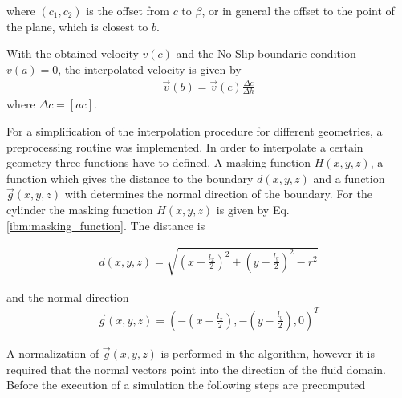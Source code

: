 where $(c_1, c_2)$ is the offset from $c$ to $\beta$, or in general the offset to the point of the plane, which is closest to $b$.

With the obtained velocity $v(c)$ and  the No-Slip boundarie condition $v(a) = 0$,
the interpolated velocity is given by
\begin{align}
    \vec{v}(b)  =  \vec{v}(c)\frac{\Delta c}{\Delta h}
\end{align}
where $\Delta c = [ac]$.

For a simplification of the interpolation procedure for different geometries, a preprocessing routine was implemented.
In order to interpolate a certain geometry three functions have to defined.
A masking function $H(x, y, z)$, a function which gives the distance to the boundary $d(x, y, z)$
and a function $\vec{g}(x, y, z)$ with determines the normal direction  of the boundary.
For the cylinder the masking function $H(x, y, z)$ is given by Eq. \ref{ibm:masking_function}.
The distance is

\begin{align}
    d(x, y, z) = \sqrt{\left(x - \frac{l_x}{2}\right)^2 + \left(y - \frac{l_y}{2}\right)^2  - r^2}
\end{align}

and the normal direction
\begin{align}
    \vec{g}(x, y, z) = \left(-\left(x - \frac{l_x}{2}\right),  - \left(y - \frac{l_y}{2}\right), 0\right)^T
\end{align}

A normalization of $\vec{g}(x, y, z)$ is performed in the algorithm,
however it is required that the normal  vectors point into the direction of the fluid domain.
Before the execution of a simulation the following steps are precomputed

